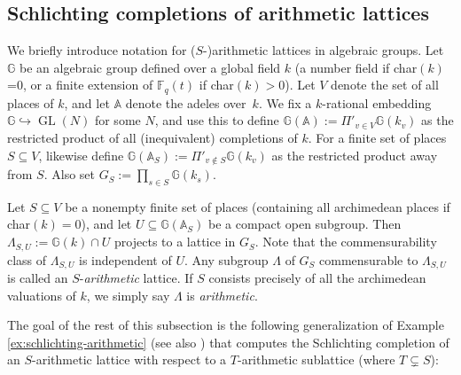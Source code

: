 \documentclass[JEP,XML,SOM,Unicode,published]{cedram}
\newcommand{\bbA}{\ensuremath{\mathbb{A}}}
\newcommand{\bbF}{\ensuremath{\mathbb{F}}}
\newcommand{\bbG}{\ensuremath{\mathbb{G}}}
\DeclareMathOperator{\GL}{GL}
\theoremstyle{definition}
\begin{document}
\subsection{Schlichting completions of arithmetic lattices}\label{sec:notation-arithmetic} We briefly introduce notation for ($S$-)arithmetic lattices in algebraic groups. Let $\bbG$ be an algebraic group defined over a global field $k$ (\ie a number field if char$(k)$=0, or a finite extension of $\bbF_q(t)$ if char$(k)>0$). Let $V$ denote the set of all places of $k$, and let $\bbA$ denote the adeles over~$k$. We fix a $k$-rational embedding $\bbG\hookrightarrow \GL(N)$ for some $N$, and use this to define $\bbG(\bbA):=\Pi'_{v\in V} \bbG(k_v)$ as the restricted product of all (inequivalent) completions of $k$. For a finite set of places $S\subseteq V$, likewise define $\bbG(\bbA_S):=\Pi'_{v\notin S} \bbG(k_v)$ as the restricted product away from $S$. Also set $G_S:=\prod_{s\in S} \bbG(k_s)$.

Let $S\subseteq V$ be a nonempty finite set of places (containing all archimedean places if char$(k)=0$), and let $U\subseteq \bbG(\bbA_S)$ be a compact open subgroup. Then $\Lambda_{S,U}:=\bbG(k)\cap U$ projects to a lattice in $G_S$. Note that the commensurability class of $\Lambda_{S,U}$ is independent of $U$. Any subgroup $\Lambda$ of $G_S$ commensurable to $\Lambda_{S,U}$ is called an $S$\nobreakdash-\emph{arithmetic} lattice. If $S$ consists precisely of all the archimedean valuations of $k$, we simply say $\Lambda$ is \emph{arithmetic}.

The goal of the rest of this subsection is the following generalization of Example \ref{ex:schlichting-arithmetic} (see also \cite[3.11]{shalom-willis}) that computes the Schlichting completion of an $S$-arithmetic lattice with respect to a $T$-arithmetic sublattice (where $T\subsetneq S$):
\end{document}
